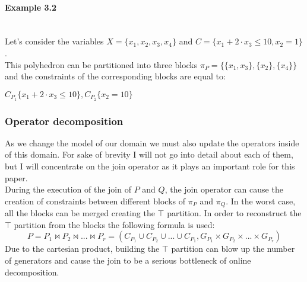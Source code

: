  
\paragraph{Example 3.2} \mbox{}\\
Let's consider the variables $X = \{x_1,x_2,x_3,x_4\}$ and $C = \{ x_1 + 2 \cdot x_3 \leq 10, x_2 = 1 \}$.\\
This polyhedron can be partitioned into three blocks $\pi_P = \{\{x_1,x_3\},\{x_2\},\{x_4\}\}$ and the constraints of the corresponding blocks are equal to: 
\begin{center}
	$C_{P_1}\{x_1 + 2\cdot x_3 \leq 10 \} , C_{P_2}\{x_2 = 10 \}$
\end{center}


\subsubsection{Operator decomposition}
As we change the model of our domain we must also update the operators inside of this domain. For sake of brevity I will not go into detail about each of them, but I will concentrate on the join operator as it plays an important role for this paper.\\
During the execution of the join of $P$ and $Q$, the join operator can cause the creation of constraints between different blocks of $\pi_P$ and $\pi_Q$. In the worst case, all the blocks can be merged creating the $\top$ partition. In order to reconstruct the $\top$ partition from the blocks the following formula is used:
\begin{equation}
	P = P_1 \Join P_2 \Join ... \Join P_r = (C_{P_1} \cup C_{P_2} \cup ... \cup C_{P_1}, G_{P_1} \times G_{P_2} \times  ... \times   G_{P_r})
\end{equation}
Due to the cartesian product, building the $\top$ partition can blow up the number of generators and cause the join to be a serious bottleneck of online decomposition.

